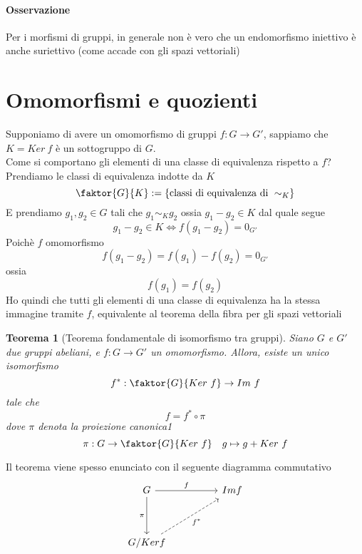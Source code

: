 \documentclass[a4paper]{report}
\newtheorem{theorem}{Teorema}
\begin{document}
\paragraph{Osservazione} Per i morfismi di gruppi, in generale non è vero che un endomorfismo iniettivo è anche suriettivo (come accade con gli spazi vettoriali)
\section{Omomorfismi e quozienti}
Supponiamo di avere un omomorfismo di gruppi $f:G\rightarrow G'$, sappiamo che $K=Ker\ f$ è un sottogruppo di $G$.\\
Come si comportano gli elementi di una classe di equivalenza rispetto a $f$?\\
Prendiamo le classi di equivalenza indotte da $K$
\[
    \faktor{G}{K}:=\{\text{classi di equivalenza di }\sim_K\}
\]
E prendiamo $g_1,g_2\in G$ tali che $g_1\sim_K g_2$ ossia $g_1-g_2\in K$ dal quale segue
\[
    g_1-g_2\in K\Longleftrightarrow f(g_1-g_2)=0_{G'}
\]
Poichè $f$ omomorfismo
\[
    f(g_1-g_2)=f(g_1)-f(g_2)=0_{G'}
\]
ossia
\[
    f(g_1)=f(g_2)
\]
Ho quindi che tutti gli elementi di una classe di equivalenza ha la stessa immagine tramite $f$, equivalente al teorema della fibra per gli spazi vettoriali
\begin{theorem}[Teorema fondamentale di isomorfismo tra gruppi]
    Siano $G$ e $G'$ due gruppi abeliani, e $f:G\rightarrow G'$ un omomorfismo. Allora, esiste un unico isomorfismo
    \[
        f^*:\faktor{G}{Ker\ f}\rightarrow Im\ f
    \]
    tale che
    \[
        f=f^*\circ \pi
    \]
    dove $\pi$ denota la proiezione canonica1
    \[
        \pi:G\rightarrow\faktor{G}{Ker\ f}\quad g\mapsto g+Ker\ f
    \]
\end{theorem}
Il teorema viene spesso enunciato con il seguente diagramma commutativo
\[
    \begin{tikzcd}
        G && {Im f} \\
        \\
        {G/Ker f}
        \arrow["\pi"', from=1-1, to=3-1]
        \arrow["{f^*}"', dashed, from=3-1, to=1-3]
        \arrow["f", from=1-1, to=1-3]
    \end{tikzcd}
\]
\end{document}
